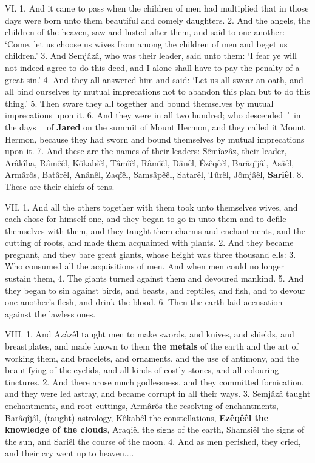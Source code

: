 VI. 1. And it came to pass when the children of
men had multiplied that in those days were born
unto them beautiful and comely daughters. 2. And
the angels, the children of the heaven, saw and lusted
after them, and said to one another: ‘Come, let us
choose us wives from among the children of men and
beget us children.’ 3. And Semjâzâ, who was their
leader, said unto them: ‘I fear ye will not indeed
agree to do this deed, and I alone shall have to pay
the penalty of a great sin.’ 4. And they all answered
him and said: ‘Let us all swear an oath, and all bind
ourselves by mutual imprecations not to abandon this
plan but to do this thing.’ 5. Then sware they all
together and bound themselves by mutual imprecations
upon it. 6. And they were in all two hundred;
who descended $\ulcorner$in the days$\urcorner$ of \textbf{Jared} on the summit
of Mount Hermon, and they called it Mount Hermon,
because they had sworn and bound themselves by
mutual imprecations upon it. 7. And these are the
names of their leaders: Sêmîazâz, their leader,
Arâkîba, Râmêêl, Kôkabîêl, Tâmîêl, Râmîêl, Dânêl,
Êzêqêêl, Barâqîjâl, Asâêl, Armârôs, Batârêl, Anânêl,
Zaqîêl, Samsâpêêl, Satarêl, Tûrêl, Jômjâêl, \textbf{Sariêl}.
8. These are their chiefs of tens.

VII. 1. And all the others together with them took
unto themselves wives, and each chose for himself
one, and they began to go in unto them and to defile
themselves with them, and they taught them charms
and enchantments, and the cutting of roots, and made
them acquainted with plants. 2. And they became
pregnant, and they bare great giants, whose height
was three thousand ells: 3. Who consumed all
the acquisitions of men. And when men could no
longer sustain them, 4. The giants turned against
them and devoured mankind. 5. And they began to
sin against birds, and beasts, and reptiles, and fish,
and to devour one another’s flesh, and drink the
blood. 6. Then the earth laid accusation against
the lawless ones.

VIII. 1. And Azâzêl taught men to make swords,
and knives, and shields, and breastplates, and made
known to them \textbf{the metals} of the earth and the art
of working them, and bracelets, and ornaments, and
the use of antimony, and the beautifying of the
eyelids, and all kinds of costly stones, and all colouring
tinctures. 2. And there arose much godlessness,
and they committed fornication, and they were
led astray, and became corrupt in all their ways.
3. Semjâzâ taught enchantments, and root-cuttings,
Armârôs the resolving of enchantments, Barâqîjâl,
(taught) astrology, Kôkabêl the constellations, \textbf{Ezêqêêl
the knowledge of the clouds}, Araqiêl the
signs of the earth, Shamsiêl the signs of the sun,
and Sariêl the course of the moon. 4. And as
men perished, they cried, and their cry went up to
heaven....

